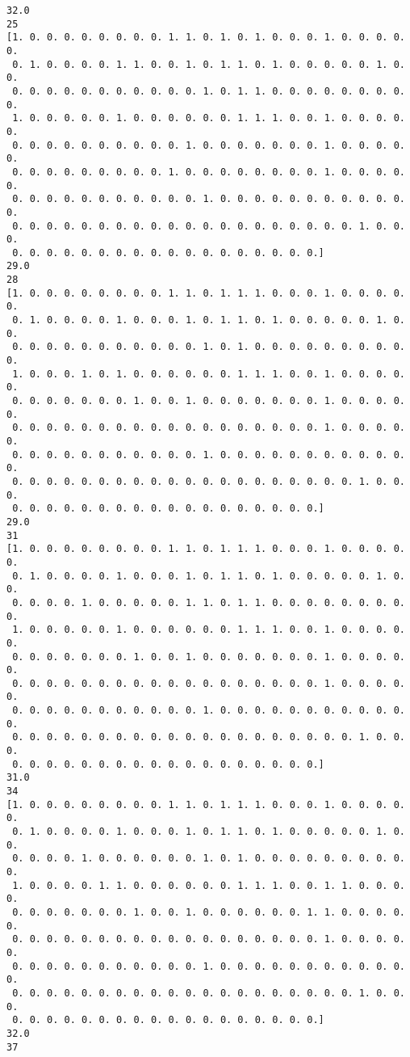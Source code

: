 \documentclass[11pt]{article}
\begin{document}
\begin{Verbatim}[commandchars=\\\{\}]
32.0
25
[1. 0. 0. 0. 0. 0. 0. 0. 0. 1. 1. 0. 1. 0. 1. 0. 0. 0. 1. 0. 0. 0. 0. 0.
 0. 1. 0. 0. 0. 0. 1. 1. 0. 0. 1. 0. 1. 1. 0. 1. 0. 0. 0. 0. 0. 1. 0. 0.
 0. 0. 0. 0. 0. 0. 0. 0. 0. 0. 0. 1. 0. 1. 1. 0. 0. 0. 0. 0. 0. 0. 0. 0.
 1. 0. 0. 0. 0. 0. 1. 0. 0. 0. 0. 0. 0. 1. 1. 1. 0. 0. 1. 0. 0. 0. 0. 0.
 0. 0. 0. 0. 0. 0. 0. 0. 0. 0. 1. 0. 0. 0. 0. 0. 0. 0. 1. 0. 0. 0. 0. 0.
 0. 0. 0. 0. 0. 0. 0. 0. 0. 1. 0. 0. 0. 0. 0. 0. 0. 0. 1. 0. 0. 0. 0. 0.
 0. 0. 0. 0. 0. 0. 0. 0. 0. 0. 0. 1. 0. 0. 0. 0. 0. 0. 0. 0. 0. 0. 0. 0.
 0. 0. 0. 0. 0. 0. 0. 0. 0. 0. 0. 0. 0. 0. 0. 0. 0. 0. 0. 0. 1. 0. 0. 0.
 0. 0. 0. 0. 0. 0. 0. 0. 0. 0. 0. 0. 0. 0. 0. 0. 0. 0.]
29.0
28
[1. 0. 0. 0. 0. 0. 0. 0. 0. 1. 1. 0. 1. 1. 1. 0. 0. 0. 1. 0. 0. 0. 0. 0.
 0. 1. 0. 0. 0. 0. 1. 0. 0. 0. 1. 0. 1. 1. 0. 1. 0. 0. 0. 0. 0. 1. 0. 0.
 0. 0. 0. 0. 0. 0. 0. 0. 0. 0. 0. 1. 0. 1. 0. 0. 0. 0. 0. 0. 0. 0. 0. 0.
 1. 0. 0. 0. 1. 0. 1. 0. 0. 0. 0. 0. 0. 1. 1. 1. 0. 0. 1. 0. 0. 0. 0. 0.
 0. 0. 0. 0. 0. 0. 0. 1. 0. 0. 1. 0. 0. 0. 0. 0. 0. 0. 1. 0. 0. 0. 0. 0.
 0. 0. 0. 0. 0. 0. 0. 0. 0. 0. 0. 0. 0. 0. 0. 0. 0. 0. 1. 0. 0. 0. 0. 0.
 0. 0. 0. 0. 0. 0. 0. 0. 0. 0. 0. 1. 0. 0. 0. 0. 0. 0. 0. 0. 0. 0. 0. 0.
 0. 0. 0. 0. 0. 0. 0. 0. 0. 0. 0. 0. 0. 0. 0. 0. 0. 0. 0. 0. 1. 0. 0. 0.
 0. 0. 0. 0. 0. 0. 0. 0. 0. 0. 0. 0. 0. 0. 0. 0. 0. 0.]
29.0
31
[1. 0. 0. 0. 0. 0. 0. 0. 0. 1. 1. 0. 1. 1. 1. 0. 0. 0. 1. 0. 0. 0. 0. 0.
 0. 1. 0. 0. 0. 0. 1. 0. 0. 0. 1. 0. 1. 1. 0. 1. 0. 0. 0. 0. 0. 1. 0. 0.
 0. 0. 0. 0. 1. 0. 0. 0. 0. 0. 1. 1. 0. 1. 1. 0. 0. 0. 0. 0. 0. 0. 0. 0.
 1. 0. 0. 0. 0. 0. 1. 0. 0. 0. 0. 0. 0. 1. 1. 1. 0. 0. 1. 0. 0. 0. 0. 0.
 0. 0. 0. 0. 0. 0. 0. 1. 0. 0. 1. 0. 0. 0. 0. 0. 0. 0. 1. 0. 0. 0. 0. 0.
 0. 0. 0. 0. 0. 0. 0. 0. 0. 0. 0. 0. 0. 0. 0. 0. 0. 0. 1. 0. 0. 0. 0. 0.
 0. 0. 0. 0. 0. 0. 0. 0. 0. 0. 0. 1. 0. 0. 0. 0. 0. 0. 0. 0. 0. 0. 0. 0.
 0. 0. 0. 0. 0. 0. 0. 0. 0. 0. 0. 0. 0. 0. 0. 0. 0. 0. 0. 0. 1. 0. 0. 0.
 0. 0. 0. 0. 0. 0. 0. 0. 0. 0. 0. 0. 0. 0. 0. 0. 0. 0.]
31.0
34
[1. 0. 0. 0. 0. 0. 0. 0. 0. 1. 1. 0. 1. 1. 1. 0. 0. 0. 1. 0. 0. 0. 0. 0.
 0. 1. 0. 0. 0. 0. 1. 0. 0. 0. 1. 0. 1. 1. 0. 1. 0. 0. 0. 0. 0. 1. 0. 0.
 0. 0. 0. 0. 1. 0. 0. 0. 0. 0. 0. 1. 0. 1. 0. 0. 0. 0. 0. 0. 0. 0. 0. 0.
 1. 0. 0. 0. 0. 1. 1. 0. 0. 0. 0. 0. 0. 1. 1. 1. 0. 0. 1. 1. 0. 0. 0. 0.
 0. 0. 0. 0. 0. 0. 0. 1. 0. 0. 1. 0. 0. 0. 0. 0. 0. 1. 1. 0. 0. 0. 0. 0.
 0. 0. 0. 0. 0. 0. 0. 0. 0. 0. 0. 0. 0. 0. 0. 0. 0. 0. 1. 0. 0. 0. 0. 0.
 0. 0. 0. 0. 0. 0. 0. 0. 0. 0. 0. 1. 0. 0. 0. 0. 0. 0. 0. 0. 0. 0. 0. 0.
 0. 0. 0. 0. 0. 0. 0. 0. 0. 0. 0. 0. 0. 0. 0. 0. 0. 0. 0. 0. 1. 0. 0. 0.
 0. 0. 0. 0. 0. 0. 0. 0. 0. 0. 0. 0. 0. 0. 0. 0. 0. 0.]
32.0
37

\end{Verbatim}
\end{document}
